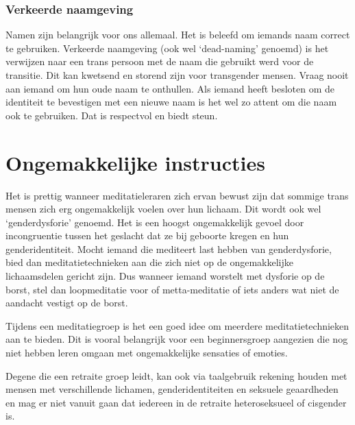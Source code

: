 \documentclass[12pt,openany]{book}
\begin{document}
\subsubsection*{Verkeerde naamgeving}

Namen zijn belangrijk voor ons allemaal. Het is beleefd om iemands naam correct te gebruiken. Verkeerde naamgeving (ook wel ‘dead-naming’ genoemd) is het verwijzen naar een trans persoon met de naam die gebruikt werd voor de transitie. Dit kan kwetsend en storend zijn voor transgender mensen. Vraag nooit aan iemand om hun oude naam te onthullen. Als iemand heeft besloten om de identiteit te bevestigen met een nieuwe naam is het wel zo attent om die naam ook te gebruiken. Dat is respectvol en biedt steun. 

\section*{Ongemakkelijke instructies}

Het is prettig wanneer meditatieleraren zich ervan bewust zijn dat sommige trans mensen zich erg ongemakkelijk voelen over hun lichaam. Dit wordt ook wel ‘genderdysforie’ genoemd. Het is een hoogst ongemakkelijk gevoel door incongruentie tussen het geslacht dat ze bij geboorte kregen en hun genderidentiteit. Mocht iemand die mediteert last hebben van genderdysforie, bied dan meditatietechnieken aan die zich niet op de ongemakkelijke lichaamsdelen gericht zijn. Dus wanneer iemand worstelt met dysforie op de borst, stel dan loopmeditatie voor of metta-meditatie of iets anders wat niet de aandacht vestigt op de borst.

Tijdens een meditatiegroep is het een goed idee om meerdere meditatietechnieken aan te bieden. Dit is vooral belangrijk voor een beginnersgroep aangezien die nog niet hebben leren omgaan met ongemakkelijke sensaties of emoties. 

Degene die een retraite groep leidt, kan ook via taalgebruik rekening houden met mensen met verschillende lichamen, genderidentiteiten en seksuele geaardheden en mag er niet vanuit gaan dat iedereen in de retraite heteroseksueel of cisgender is.

\bigskip
\end{document}

